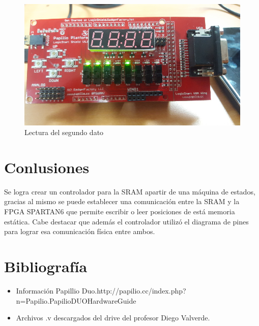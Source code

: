 \documentclass[10pt]{article}
\begin{document}
\begin{figure}[hbtp]
\centering
\includegraphics[width=1\textwidth]{lecturab.jpg}
\caption{Lectura del segundo dato}
\label{lectura_2}
\end{figure}
\pagebreak
\section{Conlusiones}
Se logra crear un controlador para la SRAM apartir de una máquina de estados, gracias al mismo se puede establecer una comunicación entre la SRAM y la FPGA SPARTAN6 que permite escribir o leer posiciones de está memoria estática. Cabe destacar que además el controlador utilizó el diagrama de pines para lograr esa comunicación física entre ambos.\\
\section{Bibliografía}
\begin{itemize}
\item Información Papillio Duo.http://papilio.cc/index.php?n=Papilio.PapilioDUOHardwareGuide
\item Archivos .v descargados del drive del profesor Diego Valverde.
\end{itemize}
\end{document}
